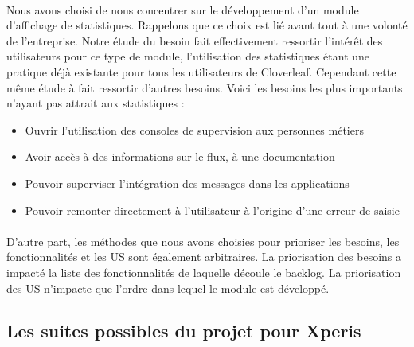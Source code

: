 			\paragraph{}%
			Nous avons choisi de nous concentrer sur le développement d'un module
			d'affichage de statistiques. Rappelons que ce choix est lié avant tout
			à une volonté de l'entreprise. Notre étude du besoin fait effectivement
			ressortir l'intérêt des utilisateurs pour ce type de module, l'utilisation
			des statistiques étant une pratique déjà existante pour tous les utilisateurs
			de Cloverleaf. Cependant cette même étude à fait ressortir d'autres besoins.
			Voici les besoins les plus importants n'ayant pas attrait aux statistiques :
			\begin{itemize}
			  \item Ouvrir l'utilisation des consoles de supervision aux personnes
			  métiers
			  \item Avoir accès à des informations sur le flux, à une documentation
			  \item Pouvoir superviser l'intégration des messages dans les applications
			  \item Pouvoir remonter directement à l'utilisateur à l'origine d'une erreur
			  de saisie
			\end{itemize}
			
			\paragraph{}%
			D'autre part, les méthodes que nous avons choisies pour prioriser les
			besoins, les fonctionnalités et les US sont également arbitraires. La
			priorisation des besoins a impacté la liste des fonctionnalités de laquelle
			découle le backlog. La priorisation des US n'impacte que l'ordre
			dans lequel le module est développé.
			
		\subsection{Les suites possibles du projet pour Xperis}
